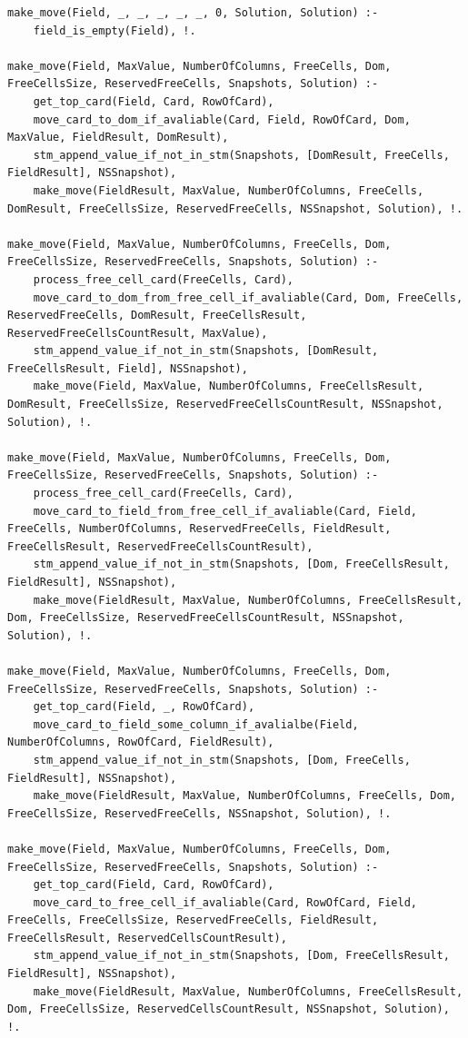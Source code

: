 \documentclass[12pt]{report}
\begin{document}
\begin{lstlisting}[label=some-code, caption=реализация make\_move]
make_move(Field, _, _, _, _, _, 0, Solution, Solution) :-
	field_is_empty(Field), !.

make_move(Field, MaxValue, NumberOfColumns, FreeCells, Dom, FreeCellsSize, ReservedFreeCells, Snapshots, Solution) :-
	get_top_card(Field, Card, RowOfCard),
	move_card_to_dom_if_avaliable(Card, Field, RowOfCard, Dom, MaxValue, FieldResult, DomResult),
	stm_append_value_if_not_in_stm(Snapshots, [DomResult, FreeCells, FieldResult], NSSnapshot),
	make_move(FieldResult, MaxValue, NumberOfColumns, FreeCells, DomResult, FreeCellsSize, ReservedFreeCells, NSSnapshot, Solution), !.

make_move(Field, MaxValue, NumberOfColumns, FreeCells, Dom, FreeCellsSize, ReservedFreeCells, Snapshots, Solution) :-
	process_free_cell_card(FreeCells, Card),
	move_card_to_dom_from_free_cell_if_avaliable(Card, Dom, FreeCells, ReservedFreeCells, DomResult, FreeCellsResult, ReservedFreeCellsCountResult, MaxValue),
	stm_append_value_if_not_in_stm(Snapshots, [DomResult, FreeCellsResult, Field], NSSnapshot),
	make_move(Field, MaxValue, NumberOfColumns, FreeCellsResult, DomResult, FreeCellsSize, ReservedFreeCellsCountResult, NSSnapshot, Solution), !.

make_move(Field, MaxValue, NumberOfColumns, FreeCells, Dom, FreeCellsSize, ReservedFreeCells, Snapshots, Solution) :-
	process_free_cell_card(FreeCells, Card),
	move_card_to_field_from_free_cell_if_avaliable(Card, Field, FreeCells, NumberOfColumns, ReservedFreeCells, FieldResult, FreeCellsResult, ReservedFreeCellsCountResult),
	stm_append_value_if_not_in_stm(Snapshots, [Dom, FreeCellsResult, FieldResult], NSSnapshot),
	make_move(FieldResult, MaxValue, NumberOfColumns, FreeCellsResult, Dom, FreeCellsSize, ReservedFreeCellsCountResult, NSSnapshot, Solution), !.

make_move(Field, MaxValue, NumberOfColumns, FreeCells, Dom, FreeCellsSize, ReservedFreeCells, Snapshots, Solution) :-
	get_top_card(Field, _, RowOfCard),
	move_card_to_field_some_column_if_avalialbe(Field, NumberOfColumns, RowOfCard, FieldResult),
	stm_append_value_if_not_in_stm(Snapshots, [Dom, FreeCells, FieldResult], NSSnapshot),
	make_move(FieldResult, MaxValue, NumberOfColumns, FreeCells, Dom, FreeCellsSize, ReservedFreeCells, NSSnapshot, Solution), !.

make_move(Field, MaxValue, NumberOfColumns, FreeCells, Dom, FreeCellsSize, ReservedFreeCells, Snapshots, Solution) :-
	get_top_card(Field, Card, RowOfCard),
	move_card_to_free_cell_if_avaliable(Card, RowOfCard, Field, FreeCells, FreeCellsSize, ReservedFreeCells, FieldResult, FreeCellsResult, ReservedCellsCountResult),
	stm_append_value_if_not_in_stm(Snapshots, [Dom, FreeCellsResult, FieldResult], NSSnapshot),
	make_move(FieldResult, MaxValue, NumberOfColumns, FreeCellsResult, Dom, FreeCellsSize, ReservedCellsCountResult, NSSnapshot, Solution), !.

\end{lstlisting}
\end{document}
